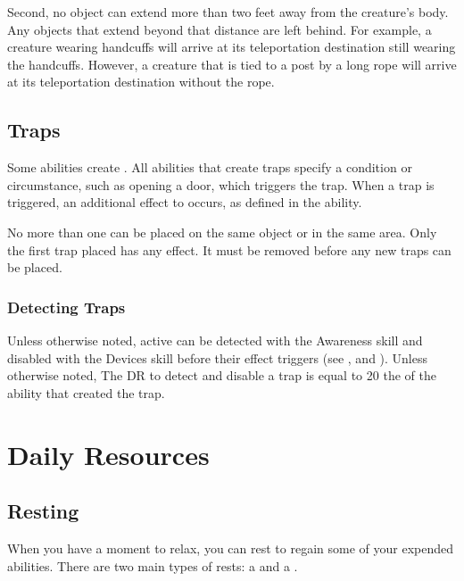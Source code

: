         Second, no object can extend more than two feet away from the creature's body.
        Any objects that extend beyond that distance are left behind.
        For example, a creature wearing handcuffs will arrive at its teleportation destination still wearing the handcuffs.
        However, a creature that is tied to a post by a long rope will arrive at its teleportation destination without the rope.

    \subsection{Traps}\label{Traps}
        Some abilities create .
        All abilities that create traps specify a condition or circumstance, such as opening a door, which triggers the trap.
        When a trap is triggered, an additional effect to occurs, as defined in the ability.

        No more than one  can be placed on the same object or in the same area.
        Only the first trap placed has any effect.
        It must be removed before any new traps can be placed.

        \subsubsection{Detecting Traps}\label{Detecting Traps}
        Unless otherwise noted, active  can be detected with the Awareness skill and disabled with the Devices skill before their effect triggers (see , and ).
        Unless otherwise noted, The DR to detect and disable a trap is equal to 20 \add the  of the ability that created the trap.

\section{Daily Resources}

    \subsection{Resting}\label{Resting}
        When you have a moment to relax, you can rest to regain some of your expended abilities.
        There are two main types of rests: a  and a .

